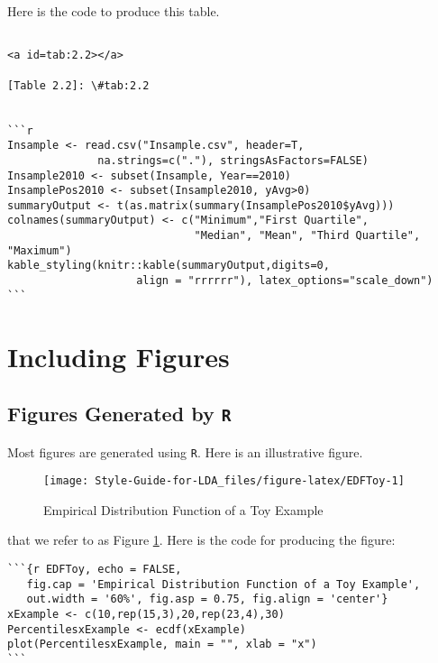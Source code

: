 \documentclass[
]{book}
\begin{document}
Here is the code to produce this table.

\begin{verbatim}

<a id=tab:2.2></a> 

[Table 2.2]: \#tab:2.2


```r
Insample <- read.csv("Insample.csv", header=T,  
              na.strings=c("."), stringsAsFactors=FALSE)
Insample2010 <- subset(Insample, Year==2010)
InsamplePos2010 <- subset(Insample2010, yAvg>0)
summaryOutput <- t(as.matrix(summary(InsamplePos2010$yAvg)))
colnames(summaryOutput) <- c("Minimum","First Quartile", 
                             "Median", "Mean", "Third Quartile", "Maximum")
kable_styling(knitr::kable(summaryOutput,digits=0, 
                    align = "rrrrrr"), latex_options="scale_down")
```
\end{verbatim}

\hypertarget{including-figures}{%
\section{Including Figures}\label{including-figures}}

\hypertarget{figures-generated-by-r}{%
\subsection{\texorpdfstring{Figures Generated by \texttt{R}}{Figures Generated by R}}\label{figures-generated-by-r}}

Most figures are generated using \texttt{R}. Here is an illustrative figure.

\begin{figure}

{\centering \texttt{[image: Style-Guide-for-LDA\_files/figure-latex/EDFToy-1]} 

}

\caption{Empirical Distribution Function of a Toy Example}\label{fig:EDFToy}
\end{figure}

that we refer to as Figure \ref{fig:EDFToy}. Here is the code for producing the figure:

\begin{verbatim}
```{r EDFToy, echo = FALSE, 
   fig.cap = 'Empirical Distribution Function of a Toy Example',
   out.width = '60%', fig.asp = 0.75, fig.align = 'center'}
xExample <- c(10,rep(15,3),20,rep(23,4),30)
PercentilesxExample <- ecdf(xExample)
plot(PercentilesxExample, main = "", xlab = "x")
```
\end{verbatim}
\end{document}
